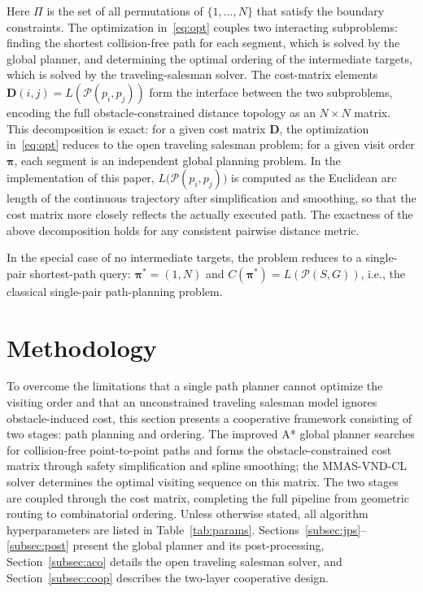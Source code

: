 \documentclass[lettersize,journal]{IEEEtran}
\begin{document}
Here $\Pi$ is the set of all permutations of $\{1, \dots, N\}$ that satisfy the boundary constraints. The optimization in~\textcolor{blue}{\eqref{eq:opt}} couples two interacting subproblems: finding the shortest collision-free path for each segment, which is solved by the global planner, and determining the optimal ordering of the intermediate targets, which is solved by the traveling-salesman solver. The cost-matrix elements $\mathbf{D}(i, j) = L(\mathcal{P}(p_i, p_j))$ form the interface between the two subproblems, encoding the full obstacle-constrained distance topology as an $N \times N$ matrix. This decomposition is exact: for a given cost matrix $\mathbf{D}$, the optimization in~\textcolor{blue}{\eqref{eq:opt}} reduces to the open traveling salesman problem; for a given visit order $\bm{\pi}$, each segment is an independent global planning problem. In the implementation of this paper, $L\big(\mathcal{P}(p_i, p_j)\big)$ is computed as the Euclidean arc length of the continuous trajectory after simplification and smoothing, so that the cost matrix more closely reflects the actually executed path. The exactness of the above decomposition holds for any consistent pairwise distance metric.

In the special case of no intermediate targets, the problem reduces to a single-pair shortest-path query: $\bm{\pi}^{*} = (1, N)$ and $C(\bm{\pi}^{*}) = L(\mathcal{P}(S, G))$, i.e., the classical single-pair path-planning problem.


\section{Methodology}
\label{sec:method}

To overcome the limitations that a single path planner cannot optimize the visiting order and that an unconstrained traveling salesman model ignores obstacle-induced cost, this section presents a cooperative framework consisting of two stages: path planning and ordering. The improved A* global planner searches for collision-free point-to-point paths and forms the obstacle-constrained cost matrix through safety simplification and spline smoothing; the MMAS-VND-CL solver determines the optimal visiting sequence on this matrix. The two stages are coupled through the cost matrix, completing the full pipeline from geometric routing to combinatorial ordering. Unless otherwise stated, all algorithm hyperparameters are listed in Table~\textcolor{blue}{\ref{tab:params}}. Sections~\textcolor{blue}{\ref{subsec:jps}}--\textcolor{blue}{\ref{subsec:post}} present the global planner and its post-processing, Section~\textcolor{blue}{\ref{subsec:aco}} details the open traveling salesman solver, and Section~\textcolor{blue}{\ref{subsec:coop}} describes the two-layer cooperative design.
\end{document}
